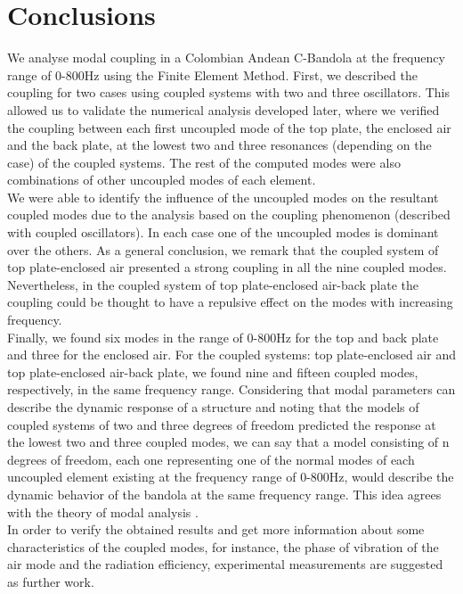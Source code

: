 \section{Conclusions}

We analyse modal coupling in a Colombian Andean C-Bandola at the frequency range of 0-800Hz using the Finite Element Method. First, we described the coupling for two cases using coupled systems with two and three oscillators. This allowed us to validate the numerical analysis developed later, where we verified the coupling between each first uncoupled mode of the top plate, the enclosed air and the back plate, at the lowest two and three resonances (depending on the case) of the coupled systems. The rest of the computed modes were also combinations of other uncoupled modes of each element.\\

We were able to identify the influence of the uncoupled modes on the resultant coupled modes due to the analysis based on the coupling phenomenon (described with coupled oscillators). In each case one of the uncoupled modes is dominant over the others. As a general conclusion, we remark that the coupled system of top plate-enclosed air presented a strong coupling in all the nine coupled modes. Nevertheless, in the coupled system of top plate-enclosed air-back plate the coupling could be thought to have a repulsive effect on the modes with increasing frequency.\\

Finally, we found six modes in the range of 0-800Hz for the top and back plate and three for the enclosed air. For the coupled systems: top plate-enclosed air and top plate-enclosed air-back plate, we found nine and fifteen coupled modes, respectively, in the same frequency range. Considering that modal parameters can describe the dynamic response of a structure and noting that the models of coupled systems of two and three degrees of freedom predicted the response at the lowest two and three coupled modes, we can say that a model consisting of n degrees of freedom, each one representing one of the normal modes of each uncoupled element existing at the frequency range of 0-800Hz, would describe the dynamic behavior of the bandola at the same frequency range. This idea agrees with the theory of modal analysis \cite{Ewins}.\\

In order to verify the obtained results and get more information about some characteristics of the coupled modes, for instance, the phase of vibration of the air mode and the radiation efficiency, experimental measurements are suggested as further work.
